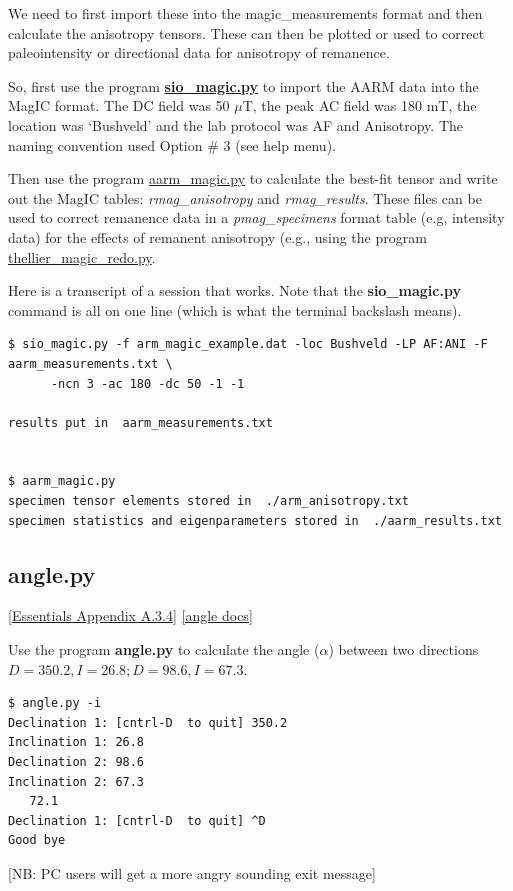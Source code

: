 \documentclass[11pt]{book}
\begin{document}
{{ We need to first import these into the magic\_measurements format and then calculate the anisotropy tensors.  These can then be plotted or used to correct paleointensity or directional data for anisotropy of remanence.

So,  first use the program \href{#sio_magic.py}{\bf sio\_magic.py}  to import the AARM data  into the MagIC format.  The DC field was 50 $\mu$T, the peak AC field was 180 mT, the location was `Bushveld' and the lab protocol was AF and Anisotropy.   The naming convention used Option \# 3 (see help menu).

Then use the program \href{#aarm_magic.py}{aarm\_magic.py}  to calculate the best-fit tensor and write out the MagIC tables: {\it rmag\_anisotropy} and {\it rmag\_results}.   These files can be used to correct remanence data in a {\it pmag\_specimens} format table (e.g, intensity data) for the effects of remanent anisotropy (e.g., using the program \href{#thellier_magic.py}{thellier\_magic\_redo.py}.

Here is a transcript of a session that works.   Note that the {\bf  sio\_magic.py}  command is all on one line (which is what the terminal backslash means).

\begin{verbatim}
$ sio_magic.py -f arm_magic_example.dat -loc Bushveld -LP AF:ANI -F aarm_measurements.txt \
      -ncn 3 -ac 180 -dc 50 -1 -1

results put in  aarm_measurements.txt


$ aarm_magic.py
specimen tensor elements stored in  ./arm_anisotropy.txt
specimen statistics and eigenparameters stored in  ./aarm_results.txt

\end{verbatim}


%
\subsection{angle.py } [\href{http://earthref.org/MAGIC/books/Tauxe/Essentials/WebBook3ap1.html#Vector_multiplication}{Essentials Appendix A.3.4}]
\href{https://github.com/PmagPy/PmagPy/blob/master/programs/angle.py}{[angle docs]}


 Use the program {\bf angle.py} to calculate the angle ($\alpha$) between two directions $D=350.2, I=26.8; D=98.6, I=67.3$.

\begin{verbatim}
$ angle.py -i
Declination 1: [cntrl-D  to quit] 350.2
Inclination 1: 26.8
Declination 2: 98.6
Inclination 2: 67.3
   72.1
Declination 1: [cntrl-D  to quit] ^D
Good bye
\end{verbatim}
 [NB: PC users will get a more angry sounding exit message]

}}
\end{document}
